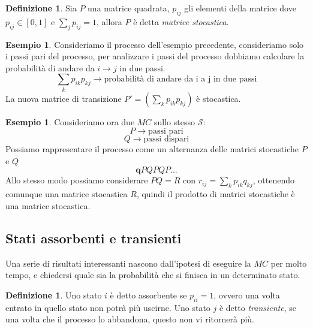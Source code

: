 \documentclass{article}
\theoremstyle{definition}
\newtheorem{definition}[theorem]{Definizione}
\newtheorem{example}[theorem]{Esempio}
\theoremstyle{remark}
\begin{document}
\begin{definition}
    Sia $P$ una matrice quadrata, $p_{ij}$ gli elementi della matrice dove $p_{ij}\in[0,1]$ e $\sum_j p_{ij} = 1$, allora $P$ è detta \textit{matrice stocastica}.
\end{definition}
\begin{example}
    Consideriamo il processo dell'esempio precedente, consideriamo solo i passi pari del processo, per analizzare i passi del processo dobbiamo calcolare
    la probabilità di andare da $i\to j$ in due passi. 
    $$\sum_k p_{ik}p_{kj}\rightarrow\text{probabilità di andare da i a j in due passi}$$
    La nuova matrice di transizione $P' = (\sum_k p_{ik}p_{kj})$  è stocastica.
\end{example}
\begin{example}
    Consideriamo ora due $MC$ sullo stesso $\mathcal{S}$:
    $$ P\to \text{passi pari}$$
    $$ Q\to \text{passi dispari}$$
    Possiamo rappresentare il processo come un alternanza delle matrici stocastiche $P$ e $Q$
    $$\boldsymbol{q}PQPQP\dots$$
    Allo stesso modo possiamo considerare  $PQ=R$ con $r_{ij} = \sum_k p_{ik}q_{kj}$, ottenendo comunque una matrice stocastica $R$,
    quindi il prodotto di matrici stocastiche è una matrice stocastica.
\end{example}
\subsection{Stati assorbenti e transienti}
Una serie di risultati interessanti nascono dall'ipotesi di eseguire la $MC$ per molto tempo, e chiedersi quale sia la probabilità che 
si finisca in un determinato stato.
\begin{definition}
    Uno stato $i$ è detto assorbente se $p_{ii} = 1$, ovvero una volta entrato in quello stato non potrà più uscirne. Uno stato $j$ è detto \textit{transiente}, se una volta che il processo lo abbandona, questo non vi ritornerà più.
\end{definition}
\end{document}
